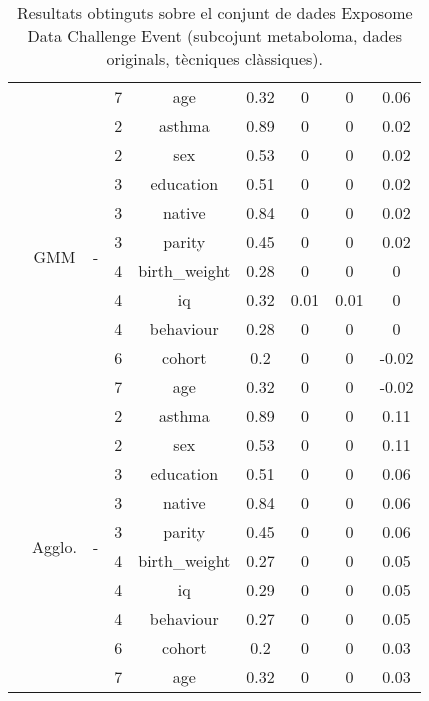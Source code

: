 \documentclass[CAT,BIB]{TFUOC}%
\begin{document}
\begin{table}
\begin{tabular}{@{}ccccccccc@{}}
            &  &  & 7 & age & 0.32 & 0 & 0 & 0.06 \\ \cmidrule(l){2-9}
            & \multirow{10}{*}{GMM} & \multirow{10}{*}{-} & 2 & asthma & 0.89 & 0 & 0 & 0.02 \\
            &  &  & 2 & sex & 0.53 & 0 & 0 & 0.02 \\
            &  &  & 3 & education & 0.51 & 0 & 0 & 0.02 \\
            &  &  & 3 & native & 0.84 & 0 & 0 & 0.02 \\
            &  &  & 3 & parity & 0.45 & 0 & 0 & 0.02 \\
            &  &  & 4 & birth\_weight & 0.28 & 0 & 0 & 0 \\
            &  &  & 4 & iq & 0.32 & 0.01 & 0.01 & 0 \\
            &  &  & 4 & behaviour & 0.28 & 0 & 0 & 0 \\
            &  &  & 6 & cohort & 0.2 & 0 & 0 & -0.02 \\
            &  &  & 7 & age & 0.32 & 0 & 0 & -0.02 \\ \cmidrule(l){2-9}
            & \multirow{10}{*}{Agglo.} & \multirow{10}{*}{-} & 2 & asthma & 0.89 & 0 & 0 & 0.11 \\
            &  &  & 2 & sex & 0.53 & 0 & 0 & 0.11 \\
            &  &  & 3 & education & 0.51 & 0 & 0 & 0.06 \\
            &  &  & 3 & native & 0.84 & 0 & 0 & 0.06 \\
            &  &  & 3 & parity & 0.45 & 0 & 0 & 0.06 \\
            &  &  & 4 & birth\_weight & 0.27 & 0 & 0 & 0.05 \\
            &  &  & 4 & iq & 0.29 & 0 & 0 & 0.05 \\
            &  &  & 4 & behaviour & 0.27 & 0 & 0 & 0.05 \\
            &  &  & 6 & cohort & 0.2 & 0 & 0 & 0.03 \\
            &  &  & 7 & age & 0.32 & 0 & 0 & 0.03 \\ \bottomrule
        \end{tabular}
        \caption[Exposome Data Challenge Event: resultats - part 1]{
            Resultats obtinguts sobre el conjunt de dades Exposome Data Challenge Event
            (subcojunt metaboloma, dades originals, tècniques clàssiques).
        }
        \label{t:results_exposome1}
    \end{table}
\end{document}
